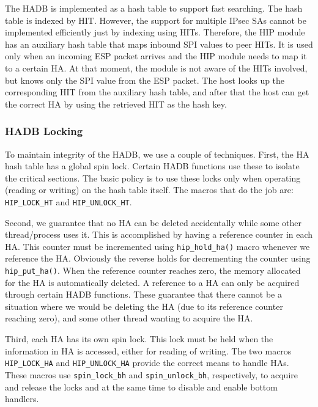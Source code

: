 The \ac{HADB} is implemented as a hash table to support fast
searching. The hash table is indexed by \ac{HIT}. However, the support
for multiple \ac{IPsec} \acp{SA} cannot be implemented
efficiently just by indexing using \acp{HIT}. Therefore, the \ac{HIP}
module has an auxiliary hash table that maps inbound \ac{SPI} values
to peer \acp{HIT}. It is used only when an incoming \ac{ESP} packet
arrives and the \ac{HIP} module needs to map it to a certain \ac{HA}.
At that moment, the module is not aware of the \acp{HIT}
involved, but knows only the \ac{SPI} value from the \ac{ESP} packet. The
host looks up the corresponding \ac{HIT} from the auxiliary hash table,
and after that the host can get the correct \ac{HA} by using the
retrieved \ac{HIT} as the hash key.

\subsubsection{HADB Locking}

To maintain integrity of the \ac{HADB}, we use a couple of techniques.
First, the \ac{HA} hash table has a global spin lock. Certain
\ac{HADB} functions use these to isolate the critical sections. The
basic policy is to use these locks only when operating (reading or
writing) on the hash table itself. The macros that do the job are:
\verb|HIP_LOCK_HT| and \verb|HIP_UNLOCK_HT|.

Second, we guarantee that no \ac{HA} can be deleted accidentally while
some other thread/process uses it. This is accomplished by having a
reference counter in each \ac{HA}. This counter must be incremented
using \verb|hip_hold_ha()| macro whenever we reference the
\ac{HA}. Obviously the reverse holds for decrementing the counter
using \verb|hip_put_ha()|. When the reference counter reaches zero,
the memory allocated for the \ac{HA} is automatically deleted.  A
reference to a \ac{HA} can only be acquired through certain \ac{HADB}
functions. These guarantee that there cannot be a situation where we
would be deleting the \ac{HA} (due to its reference counter reaching
zero), and some other thread wanting to acquire the \ac{HA}.

Third, each \ac{HA} has its own spin lock. This lock must be held
when the information in \ac{HA} is accessed, either for reading of
writing.  The two macros \verb|HIP_LOCK_HA| and \verb|HIP_UNLOCK_HA|
provide the correct means to handle \acp{HA}.  These macros use
\verb|spin_lock_bh| and \verb|spin_unlock_bh|, respectively, to
acquire and release the locks and at the same time to disable and
enable bottom handlers.


